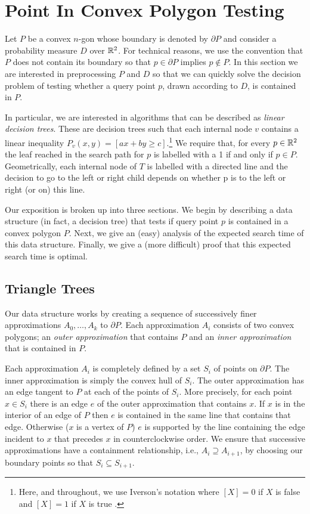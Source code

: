 \documentclass[charterfonts,lotsofwhite]{patmorin}
\newcommand{\boundary}{\partial}
\begin{document}
\section{Point In Convex Polygon Testing}

Let $P$ be a convex $n$-gon whose boundary is denoted by $\partial P$
and consider a probability measure $D$ over $\mathbb{R}^2$.  For technical
reasons, we use the convention that $P$ does not contain its boundary
so that $p\in \boundary P$ implies $p\not\in P$.  In this section we
are interested in preprocessing $P$ and $D$ so that we can quickly
solve the decision problem of testing whether a query point $p$, drawn
according to $D$, is contained in $P$. 

In particular, we are interested in algorithms that can be described
as \emph{linear decision trees}.  These are decision trees such that
each internal node $v$ contains a linear inequality $P_v(x,y)=[ax+by
\ge c]$.\footnote{Here, and throughout, we use Iverson's notation
where $[X]=0$ if $X$ is false and $[X]=1$ if $X$ is true \cite{k92}.}
We require that, for every $p\in\mathbb{R}^2$ the leaf reached in the search
path for $p$ is labelled with a 1 if and only if $p\in P$.
Geometrically, each internal node of $T$ is labelled with a directed
line and the decision to go to the left or right child depends on
whether p is to the left or right (or on) this line.  

Our exposition is broken up into three sections.  We begin by
describing a data structure (in fact, a decision tree) that tests if
query point $p$ is contained in a convex polygon  $P$.  Next, we give
an (easy) analysis of the expected search time of this data structure.
Finally, we give a (more difficult) proof that this expected search
time is optimal.


\subsection{Triangle Trees}

Our data structure works by creating a sequence of successively
finer approximations $A_0,\ldots,A_k$ to $\boundary P$.  Each
approximation $A_i$ consists of two convex polygons; an \emph{outer
approximation} that contains $P$ and an \emph{inner approximation}
that is contained in $P$.

Each approximation $A_i$ is completely defined by a set $S_i$ of
points on $\boundary P$.  The inner approximation is simply the convex
hull of $S_i$.  The outer approximation has an edge tangent to $P$ at
each of the points of $S_i$.  More precisely, for each point $x\in
S_i$ there is an edge $e$ of the outer approximation that contains
$x$.  If $x$ is in the interior of an edge of $P$ then $e$ is
contained in the same line that contains that edge. Otherwise ($x$ is
a vertex of $P$) $e$ is supported by the line containing the edge
incident to $x$ that precedes $x$ in counterclockwise order.  We
ensure that successive approximations have a containment relationship,
i.e., $A_i\supseteq A_{i+1}$, by choosing our boundary points so that
$S_i\subseteq S_{i+1}$.
\end{document}
